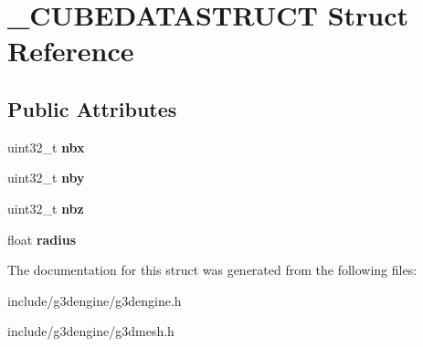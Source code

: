 \hypertarget{struct__CUBEDATASTRUCT}{}\section{\+\_\+\+C\+U\+B\+E\+D\+A\+T\+A\+S\+T\+R\+U\+CT Struct Reference}
\label{struct__CUBEDATASTRUCT}
\subsection*{Public Attributes}
\begin{DoxyCompactItemize}
\item 
\mbox{\label{struct__CUBEDATASTRUCT_a1d9466d324e4be86889ed129494004e9}} 
uint32\+\_\+t {\bfseries nbx}
\item 
\mbox{\label{struct__CUBEDATASTRUCT_a9384d8c78db606baa8f292b84917d752}} 
uint32\+\_\+t {\bfseries nby}
\item 
\mbox{\label{struct__CUBEDATASTRUCT_aec0a94dd3109eb775289e86d6de63ff0}} 
uint32\+\_\+t {\bfseries nbz}
\item 
\mbox{\label{struct__CUBEDATASTRUCT_a81d6c4a4a6b4883c260646d52d1da3eb}} 
float {\bfseries radius}
\end{DoxyCompactItemize}


The documentation for this struct was generated from the following files\+:\begin{DoxyCompactItemize}
\item 
include/g3dengine/g3dengine.\+h\item 
include/g3dengine/g3dmesh.\+h\end{DoxyCompactItemize}
